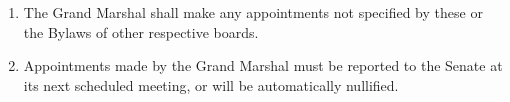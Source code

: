 \begin{enumerate}
\item The Grand Marshal shall make any appointments not specified by these or the Bylaws of other respective boards.
\item Appointments made by the Grand Marshal must be reported to the Senate at its next scheduled meeting, or will be automatically nullified.
\end{enumerate}